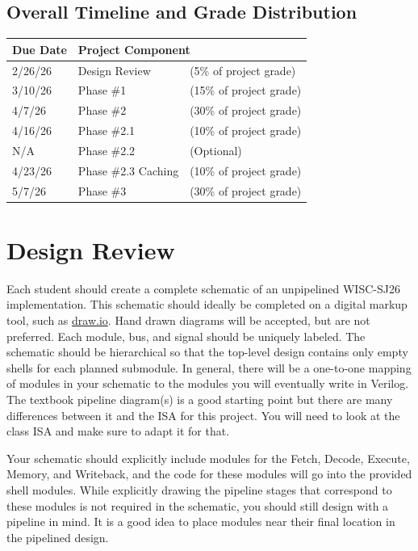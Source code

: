 \documentclass[12pt]{article}
\begin{document}
\subsection*{Overall Timeline and Grade Distribution}
\begin{center}
\begin{tabular}{|l|l|l|}
\hline
\textbf{Due Date} & \multicolumn{2}{l|}{\textbf{Project Component}} \\
\hline
2/26/26 & Design Review & (5\% of project grade) \\
\hline
3/10/26 & Phase \#1 & (15\% of project grade) \\
\hline
4/7/26 & Phase \#2 & (30\% of project grade) \\
\hline
4/16/26 & Phase \#2.1 & (10\% of project grade) \\
\hline
N/A & Phase \#2.2 & (Optional) \\
\hline
4/23/26 & Phase \#2.3 Caching & (10\% of project grade) \\
\hline
5/7/26 & Phase \#3 & (30\% of project grade) \\
\hline
\end{tabular}
\end{center}

\section*{Design Review}
Each student should create a complete schematic of an unpipelined WISC-SJ26 implementation. This schematic should ideally be completed on a digital markup tool, such as \href{https://app.diagrams.net/}{draw.io}. Hand drawn diagrams will be accepted, but are not preferred. Each module, bus, and signal should be uniquely labeled. The schematic should be hierarchical so that the top-level design contains only empty shells for each planned submodule. In general, there will be a one-to-one mapping of modules in your schematic to the modules you will eventually write in Verilog. The textbook pipeline diagram(s) is a good starting point but there are many differences between it and the ISA for this project. You will need to look at the class ISA and make sure to adapt it for that.

Your schematic should explicitly include modules for the Fetch, Decode, Execute, Memory, and Writeback, and the code for these modules will go into the provided shell modules. While explicitly drawing the pipeline stages that correspond to these modules is not required in the schematic, you should still design with a pipeline in mind. It is a good idea to place modules near their final location in the pipelined design.
\end{document}
